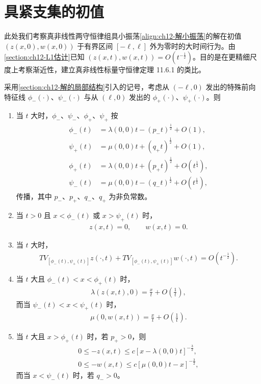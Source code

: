 \documentclass[../../main.tex]{subfiles}
\begin{document}
\section{具紧支集的初值}\label{section:ch12-紧支集}

此处我们考察真非线性两守恒律组具小振荡\eqref{align:ch12-解小振荡}的解在初值 $(z(x,0),w(x,0))$ 于有界区间 $[-\ell,\ell]$ 外为零时的大时间行为。由\cref{section:ch12-L1估计}已知 $(z(x,t),w(x,t))=O(t^{-\frac12})$。目的是在更精细尺度上考察渐近性，建立真非线性标量守恒律定理 11.6.1 的类比。

\begin{theorem}\label{theorem:ch12-紧支渐近}
采用\cref{section:ch12-解的局部结构}引入的记号，考虑从 $(-\ell,0)$ 发出的特殊前向特征线 $\phi_-(\cdot)$、$\psi_-(\cdot)$ 与从 $(\ell,0)$ 发出的 $\phi_+(\cdot)$、$\psi_+(\cdot)$。则
\begin{enumerate}
\item[\textup{(a)}] 当 $t$ 大时，$\phi_-$、$\psi_-$、$\phi_+$、$\psi_+$ 按
\begin{align}
\phi_-(t)&=\lambda(0,0)t-(p_-t)^{\frac12}+O(1),
\label{align:ch12-phi-}\\
\psi_+(t)&=\mu(0,0)t+(q_+t)^{\frac12}+O(1),
\label{align:ch12-psi+}\\
\phi_+(t)&=\lambda(0,0)t+(p_+t)^{\frac12}+O(t^{\frac14}),
\label{align:ch12-phi+}\\
\psi_-(t)&=\mu(0,0)t-(q_-t)^{\frac12}+O(t^{\frac14}),
\label{align:ch12-psi-}
\end{align}
传播，其中 $p_-$、$p_+$、$q_-$、$q_+$ 为非负常数。
\item[\textup{(b)}] 当 $t>0$ 且 $x<\phi_-(t)$ 或 $x>\psi_+(t)$ 时，
\begin{align}
z(x,t)=0,\qquad w(x,t)=0.
\label{align:ch12-静止区}
\end{align}
\item[\textup{(c)}] 当 $t$ 大时，
\begin{align}
TV_{[\phi_-(t),\psi_+(t)]}z(\cdot,t)+TV_{[\phi_-(t),\psi_+(t)]}w(\cdot,t)=O(t^{-\frac12}).
\label{align:ch12-TV紧支}
\end{align}
\item[\textup{(d)}] 当 $t$ 大且 $\phi_-(t)<x<\phi_+(t)$ 时，
\begin{align}
\lambda(z(x,t),0)=\frac{x}{t}+O\left(\frac1t\right),
\label{align:ch12-lambda渐近}
\end{align}
而当 $\psi_-(t)<x<\psi_+(t)$ 时，
\begin{align}
\mu(0,w(x,t))=\frac{x}{t}+O\left(\frac1t\right).
\label{align:ch12-mu渐近}
\end{align}
\item[\textup{(e)}] 当 $t$ 大且 $x>\phi_+(t)$ 时，若 $p_+>0$，则
\begin{align}
0\leqslant-z(x,t)\leqslant c[x-\lambda(0,0)t]^{-\frac32},
\label{align:ch12-z尾}\\
0\leqslant-w(x,t)\leqslant c[\mu(0,0)t-x]^{-\frac32},
\label{align:ch12-w尾}
\end{align}
而当 $x<\psi_-(t)$ 时，若 $q_->0$。
\end{enumerate}
\end{theorem}
\end{document}
